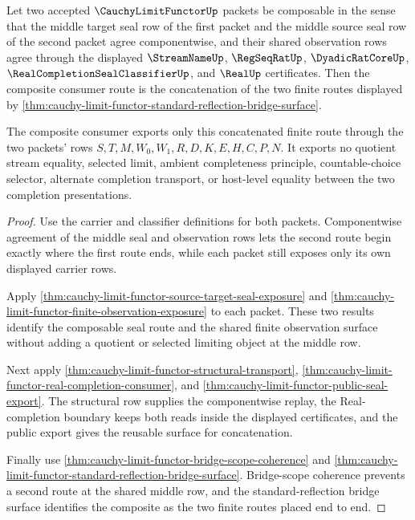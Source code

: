 \begin{theorem}
\label{thm:cauchy-limit-functor-composite-consumer}
Let two accepted $\CauchyLimitFunctorUp$ packets be composable in the sense that the middle target seal row of the first packet and the middle source seal row of the second packet agree componentwise, and their shared observation rows agree through the displayed $\StreamNameUp$, $\RegSeqRatUp$, $\DyadicRatCoreUp$, $\RealCompletionSealClassifierUp$, and $\RealUp$ certificates. Then the composite consumer route is the concatenation of the two finite routes displayed by \autoref{thm:cauchy-limit-functor-standard-reflection-bridge-surface}.

The composite consumer exports only this concatenated finite route through the two packets' rows $S,T,M,W_0,W_1,R,D,K,E,H,C,P,N$. It exports no quotient stream equality, selected limit, ambient completeness principle, countable-choice selector, alternate completion transport, or host-level equality between the two completion presentations.
\end{theorem}
\begin{proof}
Use the carrier and classifier definitions for both packets. Componentwise agreement of the middle seal and observation rows lets the second route begin exactly where the first route ends, while each packet still exposes only its own displayed carrier rows.

Apply \autoref{thm:cauchy-limit-functor-source-target-seal-exposure} and \autoref{thm:cauchy-limit-functor-finite-observation-exposure} to each packet. These two results identify the composable seal route and the shared finite observation surface without adding a quotient or selected limiting object at the middle row.

Next apply \autoref{thm:cauchy-limit-functor-structural-transport}, \autoref{thm:cauchy-limit-functor-real-completion-consumer}, and \autoref{thm:cauchy-limit-functor-public-seal-export}. The structural row supplies the componentwise replay, the Real-completion boundary keeps both reads inside the displayed certificates, and the public export gives the reusable surface for concatenation.

Finally use \autoref{thm:cauchy-limit-functor-bridge-scope-coherence} and \autoref{thm:cauchy-limit-functor-standard-reflection-bridge-surface}. Bridge-scope coherence prevents a second route at the shared middle row, and the standard-reflection bridge surface identifies the composite as the two finite routes placed end to end.
\end{proof}


